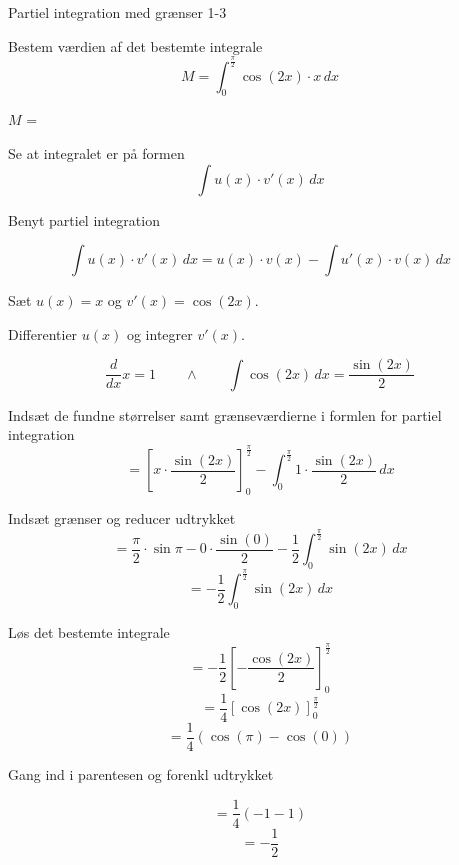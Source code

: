 \documentclass{article}
\begin{document}
\newpage

\begin{exercise}{Partiel integration med grænser 1-3}

Bestem værdien af det bestemte integrale
\[
M = \int_0^{\frac{\pi}{2}} \cos(2x) \cdot x \, dx
\]

$M$ = 


\hint

Se at integralet er på formen
\[
\int u(x) \cdot v'(x) \, dx
\]

\hint

Benyt partiel integration

\hint
\[
\int u(x) \cdot v'(x)\, dx = u(x) \cdot v(x) - \int u'(x) \cdot v(x) \, dx
\]
\hint

Sæt $u(x) = x$ og $v'(x) = \cos(2x)$.


\hint

Differentier $u(x)$ og integrer $v'(x)$.

\hint
\[
\frac{d}{dx}x = 1 \qquad \wedge \qquad \int \cos(2x) \, dx = \frac{\sin(2x)}{2}
\]

\hint

Indsæt de fundne størrelser samt grænseværdierne i formlen for partiel integration
\[
= \left[x \cdot \frac{\sin(2x)}{2}\right]_{0}^{\frac{\pi}{2}} - \int_{0}^{\frac{\pi}{2}} 1 \cdot \frac{\sin(2x)}{2} \, dx
\]

\hint

Indsæt grænser og reducer udtrykket
\[
= \frac{\pi}{2} \cdot \sin{\pi} - 0 \cdot \frac{\sin(0)}{2} - \frac{1}{2} \int_{0}^{\frac{\pi}{2}} \sin(2x) \, dx
\]
\[
 = - \frac{1}{2} \int_{0}^{\frac{\pi}{2}} \sin(2x) \, dx
\]

\hint
Løs det bestemte integrale
\[
= - \frac{1}{2} \left[ - \frac{\cos(2x)}{2} \right]_{0}^{\frac{\pi}{2}}
\]
\[
= \frac{1}{4} \left[ \cos(2x) \right]_{0}^{\frac{\pi}{2}}
\]
\[
= \frac{1}{4} \left( \cos(\pi) - \cos(0) \right)
\]

\hint
Gang ind i parentesen og forenkl udtrykket

\hint
\[
= \frac{1}{4} (-1 - 1)
\]
\[
= - \frac{1}{2}
\]



\end{exercise}

\newpage
\end{document}
